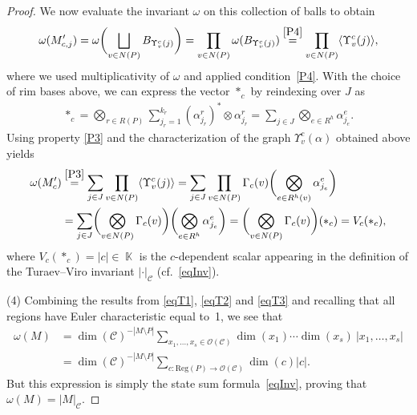 \documentclass[10pt,a4paper]{amsart}
\DeclareMathOperator{\K}{\mathbb{K}}
\numberwithin{equation}{section}
\theoremstyle{definition}
\begin{document}
\begin{proof}
 We now evaluate the invariant $\omega$ on this collection of balls to obtain
 \begin{align*}
 \omega (M'_{c,j} ) = \omega\biggl(\bigsqcup_{v \in N(P)}B_{\Upsilon_v^c(j)}\biggr) = \prod_{v \in N(P)}\omega ( B_{\Upsilon_v^c(j)} ) \overset{\rm \ref{P4}}{=} \prod_{v \in N(P)} \langle \Upsilon_v^c(j) \rangle,
 \end{align*}
 where we used multiplicativity of $\omega$ and applied condition~\ref{P4}. With the choice of rim bases above, we can express the vector $*_c$ by reindexing over $J$ as
 \begin{align*}
 *_c = \bigotimes_{r \in R(P)} \sum_{j_r = 1}^{k_r} (\alpha_{j_r}^r)^* \otimes \alpha_{j_r}^r = \sum_{j \in J} \bigotimes_{e \in R^h} \alpha_{j_e}^e.
 \end{align*}
 Using property \ref{P3} and the characterization of the graph $\Upsilon_v^c(\alpha)$ obtained above yields
 \begin{align}
 \label{eqT3}
 \omega (M'_c ) &\overset{\rm \ref{P3}}{=} \sum_{j \in J} \prod_{v \in N(P)}\langle \Upsilon_v^c(j) \rangle = \sum_{j \in J} \prod_{v \in N(P)}\Gamma_c(v)\biggl( \bigotimes_{e \in R^h(v)} \alpha_{j_e}^e\biggr) \nonumber \\
 &= \sum_{j \in J} \biggl( \bigotimes_{v \in N(P)}\Gamma_c(v)\biggr)\biggl( \bigotimes_{e \in R^h} \alpha_{j_e}^e\biggr) = \biggl( \bigotimes_{v \in N(P)}\Gamma_c(v)\biggr)(*_c) = V_c(*_c),
 \end{align}
 where $V_c(*_c) = |c| \in \K$ is the $c$-dependent scalar appearing in the definition of the Turaev--Viro invariant $|\cdot|_{\mathcal{C}}$ (cf.~\eqref{eqInv}).

 (4) Combining the results from \eqref{eqT1}, \eqref{eqT2} and \eqref{eqT3} and recalling that all regions have Euler characteristic equal to~1, we see that{\samepage
 \begin{align*}
 \omega(M) &= \dim(\mathcal{C})^{-|M\setminus P|}\sum_{x_1, \dots, x_{s} \in \mathcal{O}({\mathcal{C}})} \dim(x_1) \cdots \dim(x_{s})\ |x_1, \dots, x_{s}| \\
 &= \dim(\mathcal{C})^{-|M\setminus P|} \sum_{c\colon \mathrm{Reg}(P) \rightarrow \mathcal{O}({\mathcal{C}})} \dim(c) |c|.
 \end{align*}
 But this expression is simply the state sum formula~\eqref{eqInv}, proving that $\omega(M) = |M|_{\mathcal{C}}$.}


\end{proof}
\end{document}
